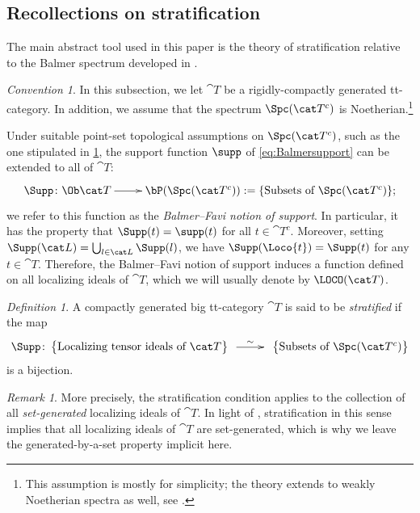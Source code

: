 \documentclass{amsart}%
\numberwithin{equation}{section}%
\theoremstyle{remark}
\newtheorem{Def}[subsection]{Definition}
\newtheorem{Conv}[subsection]{Convention}
\newtheorem{Rem}[subsection]{Remark}
\begin{document}
\subsection{Recollections on stratification}\label{ssec:recstratification}

The main abstract tool used in this paper is the theory of stratification relative to the Balmer spectrum developed in \cite{bhs1}.

\begin{Conv}\label{conv:stratification}
In this subsection, we let $\cat T$ be a rigidly-compactly generated tt-category. In addition, we assume that the spectrum $\Spc(\cat T^c)$ is Noetherian.\footnote{This assumption is mostly for simplicity; the theory extends to weakly Noetherian spectra as well, see \cite{bhs1}.}
\end{Conv}

Under suitable point-set topological assumptions \cite{BalmerFavi11, bhs1} on $\Spc(\cat T^c)$, such as the one stipulated in \cref{conv:stratification}, the support function $\supp$ of \eqref{eq:Balmersupport} can be extended to all of $\cat T$:
\begin{equation}\label{eq:BFsupport}
    \xymatrix{\Supp\colon \Ob\cat T \ar[r] & \bP(\Spc(\cat T^c)) := \{\text{Subsets of } \Spc(\cat T^c)\};}
\end{equation}
we refer to this function as the \emph{Balmer--Favi notion of support}. In particular, it has the property that $\Supp(t) = \supp(t)$ for all $t\in \cat T^c$. Moreover, setting $\Supp(\cat L) = \bigcup_{l \in \cat L}\Supp(l)$, we have $\Supp(\Loco{t}) = \Supp(t)$ for any $t\in \cat T$. Therefore, the Balmer--Favi notion of support induces a function defined on all localizing ideals of $\cat T$, which we will usually denote by $\LOCO(\cat T)$.

\begin{Def}\label{def:stratification}
A compactly generated big tt-category $\cat T$ is said to be \emph{stratified} if the map 
\[
\Supp\colon\begin{Bmatrix}
\text{Localizing tensor ideals of } \cat T
\end{Bmatrix} 
\xymatrix@C=2pc{ \ar[r]^-{\sim} &}
\begin{Bmatrix}
\text{Subsets of } \Spc(\cat T^c)
\end{Bmatrix}
\]
is a bijection.
\end{Def}

\begin{Rem}
More precisely, the stratification condition applies to the collection of all \emph{set-generated} localizing ideals of $\cat T$. In light of \cite[Prop.~3.5]{bhs1}, stratification in this sense implies that all localizing ideals of $\cat T$ are set-generated, which is why we leave the generated-by-a-set property implicit here.
\end{Rem}
\end{document}
